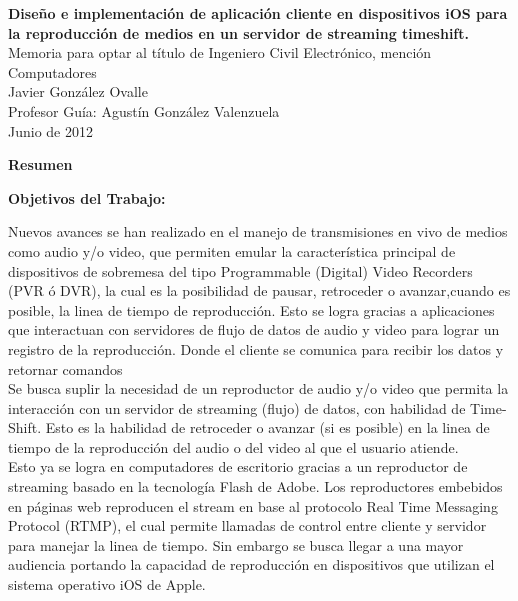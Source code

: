 \newpage
\thispagestyle{empty}
\begin{center}
 \Large \textbf{Diseño e implementación de aplicación cliente en dispositivos iOS para la reproducción de medios en un servidor de streaming timeshift.}\\

\normalsize Memoria para optar al título de Ingeniero Civil Electrónico, mención Computadores \\
\normalsize Javier González Ovalle \\
\normalsize Profesor Guía: Agustín González Valenzuela \\
\normalsize Junio de 2012

\Large \textbf{Resumen}

\end{center}
\normalsize
\textbf{Objetivos del Trabajo:}\\

\normalsize

Nuevos avances se han realizado en el manejo de transmisiones en vivo de medios como audio y/o video, que permiten emular la característica principal de dispositivos de sobremesa del tipo Programmable (Digital) Video Recorders (PVR ó DVR), la cual es la posibilidad de pausar, retroceder o avanzar,cuando es posible, la linea de tiempo de reproducción. Esto se logra gracias a aplicaciones que interactuan con servidores de flujo de datos de audio y video para lograr un registro de la reproducción. Donde el cliente se comunica para recibir los datos y retornar comandos\\ 

Se busca suplir la necesidad de un reproductor de audio y/o video que permita la interacci\'on con un servidor de streaming (flujo) de datos, con habilidad de Time-Shift. Esto es la habilidad de retroceder o avanzar (si es posible) en la linea de tiempo de la reproducci\'on del audio o del video al que el usuario atiende.\\

Esto ya se logra en computadores de escritorio gracias a un reproductor de streaming basado en la tecnolog\'ia Flash de Adobe. Los reproductores embebidos en p\'aginas web reproducen el stream en base al protocolo Real Time Messaging Protocol (RTMP), el cual permite llamadas de control entre cliente y servidor para manejar la linea de tiempo. Sin embargo se busca llegar a una mayor audiencia portando la capacidad de reproducci\'on en dispositivos que utilizan el sistema operativo iOS de Apple.\\

